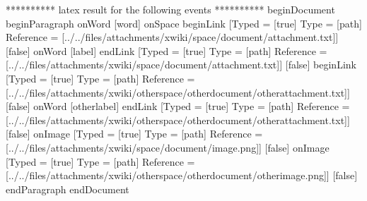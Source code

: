 ********** latex result for the following events **********
beginDocument
beginParagraph
onWord [word]
onSpace
beginLink [Typed = [true] Type = [path] Reference = [../../files/attachments/xwiki/space/document/attachment.txt]] [false]
onWord [label]
endLink [Typed = [true] Type = [path] Reference = [../../files/attachments/xwiki/space/document/attachment.txt]] [false]
beginLink [Typed = [true] Type = [path] Reference = [../../files/attachments/xwiki/otherspace/otherdocument/otherattachment.txt]] [false]
onWord [otherlabel]
endLink [Typed = [true] Type = [path] Reference = [../../files/attachments/xwiki/otherspace/otherdocument/otherattachment.txt]] [false]
onImage [Typed = [true] Type = [path] Reference = [../../files/attachments/xwiki/space/document/image.png]] [false]
onImage [Typed = [true] Type = [path] Reference = [../../files/attachments/xwiki/otherspace/otherdocument/otherimage.png]] [false]
endParagraph
endDocument